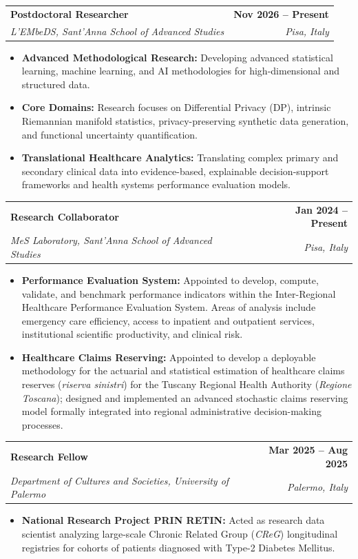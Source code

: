\documentclass[10pt,a4paper]{article}
\makeatletter
\newcommand{\cventry}[5]{
  \vspace{2pt}
  \noindent
  \begin{tabularx}{\textwidth}{@{}X r@{}}
    \textbf{#1} & \textcolor{secondary}{\textbf{#2}} \\
    \textit{#3} & \textit{\textcolor{textdark}{#4}}
  \end{tabularx}
  \vspace{-1pt}
  {\small #5}
  \vspace{2pt}
}
\makeatother
\begin{document}
\cventry{Postdoctoral Researcher}{Nov 2026 -- Present}
{L'EMbeDS, Sant'Anna School of Advanced Studies}{Pisa, Italy}
{
\begin{itemize}
    \item \textbf{Advanced Methodological Research:} Developing advanced statistical learning, machine learning, and AI methodologies for high-dimensional and structured data.
    \item \textbf{Core Domains:} Research focuses on Differential Privacy (DP), intrinsic Riemannian manifold statistics, privacy-preserving synthetic data generation, and functional uncertainty quantification.
    \item \textbf{Translational Healthcare Analytics:} Translating complex primary and secondary clinical data into evidence-based, explainable decision-support frameworks and health systems performance evaluation models.
\end{itemize}
}

\cventry{Research Collaborator}{Jan 2024 -- Present}
{MeS Laboratory, Sant'Anna School of Advanced Studies}{Pisa, Italy}
{
\begin{itemize}
    \item \textbf{Performance Evaluation System:} Appointed to develop, compute, validate, and benchmark performance indicators within the Inter-Regional Healthcare Performance Evaluation System. Areas of analysis include emergency care efficiency, access to inpatient and outpatient services, institutional scientific productivity, and clinical risk.
    \item \textbf{Healthcare Claims Reserving:} Appointed to develop a deployable methodology for the actuarial and statistical estimation of healthcare claims reserves (\textit{riserva sinistri}) for the Tuscany Regional Health Authority (\textit{Regione Toscana}); designed and implemented an advanced stochastic claims reserving model formally integrated into regional administrative decision-making processes.
\end{itemize}
}

\cventry{Research Fellow}{Mar 2025 -- Aug 2025}
{Department of Cultures and Societies, University of Palermo}{Palermo, Italy}
{
\begin{itemize}
    \item \textbf{National Research Project PRIN RETIN:} Acted as research data scientist analyzing large-scale Chronic Related Group (\textit{CReG}) longitudinal registries for cohorts of patients diagnosed with Type-2 Diabetes Mellitus.
\end{itemize}
}
\end{document}
